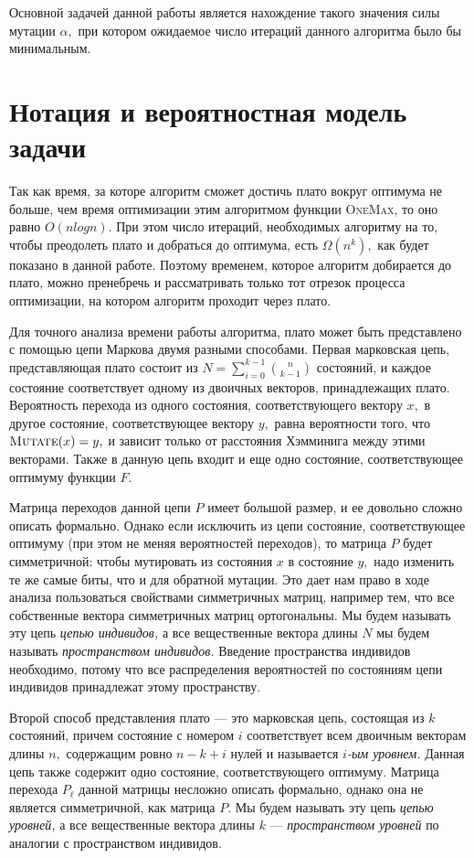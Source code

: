 \documentclass[russian]{article}
\newcommand{\OM}{\textsc{OneMax}\xspace}
\begin{document}
Основной задачей данной работы является нахождение такого значения силы мутации $\alpha,$ при котором ожидаемое число итераций данного алгоритма было бы минимальным.

\section{Нотация и вероятностная модель задачи}

Так как время, за которе алгоритм сможет достичь плато вокруг оптимума не больше, чем время оптимизации этим алгоритмом функции \OM, то оно равно $O(n log n).$ При этом число итераций, необходимых алгоритму на то, чтобы преодолеть плато и добраться до оптимума, есть $\Omega(n^k),$ как будет показано в данной работе. Поэтому временем, которое алгоритм добирается до плато, можно пренебречь и рассматривать только тот отрезок процесса оптимизации, на котором алгоритм проходит через плато.

Для точного анализа времени работы алгоритма, плато может быть представлено с помощью цепи Маркова двумя разными способами. Первая марковская цепь, представляющая плато состоит из $N = \sum\limits_{i = 0}^{k - 1} \binom{n}{k - 1}$ состояний, и каждое состояние соответствует одному из двоичных векторов, принадлежащих плато. Вероятность перехода из одного состояния, соответствующего вектору $x,$ в другое состояние, соответствующее вектору $y,$ равна вероятности того, что $\textsc{Mutate}(x) = y,$ и зависит только от расстояния Хэмминига между этими векторами. Также в данную цепь входит и еще одно состояние, соответствующее оптимуму функции $F.$

Матрица переходов данной цепи $P$ имеет большой размер, и ее довольно сложно описать формально. Однако если исключить из цепи состояние, соответствующее оптимуму (при этом не меняя вероятностей переходов), то матрица $P$ будет симметричной: чтобы мутировать из состояния $x$ в состояние $y,$ надо изменить те же самые биты, что и для обратной мутации. Это дает нам право в ходе анализа пользоваться свойствами симметричных матриц, например тем, что все собственные вектора симметричных матриц ортогональны. Мы будем называть эту цепь
\textit{цепью индивидов,} а все вещественные вектора длины $N$ мы будем называть \textit{пространством индивидов.} Введение пространства индивидов необходимо, потому что все распределения вероятностей по состояниям цепи индивидов принадлежат этому пространству.

Второй способ представления плато --- это марковская цепь, состоящая из $k$ состояний, причем состояние с номером $i$ соответствует всем двоичным векторам длины $n,$ содержащим ровно $n - k + i$ нулей и называется \textit{$i$-ым уровнем.} Данная цепь также содержит одно состояние, соответствующего оптимуму. Матрица перехода $P_\ell$ данной матрицы несложно описать формально, однако она не является симметричной, как матрица $P.$ Мы будем называть эту цепь \textit{цепью уровней,} а все вещественные вектора длины $k$ --- \textit{пространством уровней} по аналогии с пространством индивидов.
\end{document}
